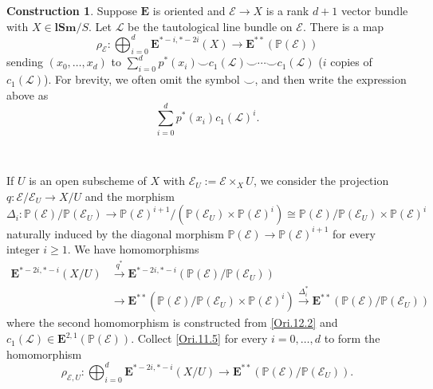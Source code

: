 \documentclass[11pt, a4paper]{amsart}
\theoremstyle{definition}
\newtheorem{const}[thm]{Construction}
\numberwithin{equation}{subsection}
\renewcommand{\P}{\mathbb{P}}
\newcommand{\lSm}{\mathbf{lSm}}
\newcommand{\cE}{\mathcal{E}}
\newcommand{\cL}{\mathcal{L}}
\newcommand{\ringE}{\mathbf{E}}
\begin{document}
\begin{const}
Suppose $\ringE$ is oriented and $\cE\to X$ is a rank $d+1$ vector bundle with $X\in \lSm/S$.
Let $\cL$ be the tautological line bundle on $\cE$.
There is a map
\begin{equation}
\label{Ori.11.1}
\rho_{\cE}
\colon
\bigoplus_{i=0}^d \ringE^{*-i,*-2i}(X)
\to
\ringE^{**}(\P(\cE))
\end{equation}
sending $(x_0,\ldots,x_d)$ to $\sum_{i=0}^d p^*(x_i) \smile c_1(\cL) \smile \cdots \smile c_1(\cL)$ 
($i$ copies of $c_1(\cL)$).
For brevity, we often omit the symbol $\smile$, and then write the expression above as 
$$
\sum_{i=0}^d p^*(x_i)c_1(\cL)^i.
$$

\

If $U$ is an open subscheme of $X$ with $\cE_U:=\cE\times_X U$, 
we consider the projection $q\colon \cE/\cE_U\to X/U$ and the morphism
\[
\Delta_i
\colon
\P(\cE)/\P(\cE_U)
\to
\P(\cE)^{i+1}/(\P(\cE_U)\times \P(\cE)^i)
\cong
\P(\cE)/\P(\cE_U) \times \P(\cE)^i
\]
naturally induced by the diagonal morphism $\P(\cE)\to \P(\cE)^{i+1}$ for every integer $i\geq 1$.
We have homomorphisms
\begin{equation}
\label{Ori.11.5}
\begin{split}
\ringE^{*-2i,*-i}(X/U)
&\xrightarrow{q^*}
\ringE^{*-2i,*-i}(\P(\cE)/\P(\cE_U))
\\
&\to
\ringE^{**}(\P(\cE)/\P(\cE_U)\times \P(\cE)^i)
\xrightarrow{\Delta_i^*}
\ringE^{**}(\P(\cE)/\P(\cE_U))
\end{split}
\end{equation}
where the second homomorphism is constructed from \eqref{Ori.12.2} and $c_1(\cL)\in \ringE^{2,1}(\P(\cE))$.
Collect \eqref{Ori.11.5} for every $i=0,\ldots,d$ to form the homomorphism
\[
\rho_{\cE,U}
\colon
\bigoplus_{i=0}^d \ringE^{*-2i,*-i}(X/U)
\to
\ringE^{**}(\P(\cE)/\P(\cE_U)).
\]
\end{const}
\end{document}
